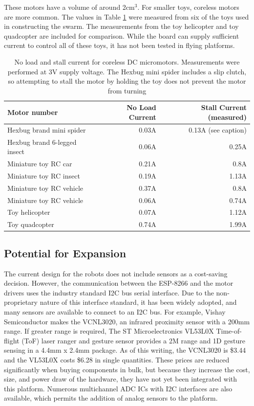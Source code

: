 These motors have a volume of around 2cm$^3$.
For smaller toys, coreless motors are more common. 
The values in Table \ref{tab:coreless} were measured from six of the toys used in constructing the swarm.
The measurements from the toy helicopter and toy quadcopter are included for comparison.
While the board can supply sufficient current to control all of these toys, it has not been tested in flying platforms.

\begin{table}
	\begin{tabular}{l r r}
		Motor number & No Load Current & Stall Current (measured)\\
		\hline 
		Hexbug brand mini spider & 0.03A & 0.13A (see caption) \\
		Hexbug brand 6-legged insect & 0.06A & 0.25A \\
		Miniature toy RC car & 0.21A & 0.8A \\
		Miniature toy RC insect & 0.19A & 1.13A \\
		Miniature toy RC vehicle & 0.37A & 0.8A \\
		Miniature toy RC vehicle & 0.06A & 0.74A \\
		Toy helicopter & 0.07A & 1.12A \\
		Toy quadcopter & 0.74A & 1.99A \\
	\end{tabular}
	\caption{No load and stall current for coreless DC micromotors. Measurements were performed at 3V supply voltage. The Hexbug mini spider includes a slip clutch, so attempting to stall the motor by holding the toy does not prevent the motor from turning}
	\label{tab:coreless}
\end{table}


\subsection{Potential for Expansion} \label{section:Potential_for_Expansion}

The current design for the robots does not include sensors as a cost-saving decision. 
However, the communication between the ESP-8266 and the motor drivers uses the industry standard I2C bus serial interface. 
Due to the non-proprietary nature of this interface standard, it has been widely adopted, and many sensors are available to connect to an I2C bus. 
For example, Vishay Semiconductor makes the VCNL3020, an infrared proximity sensor with a 200mm range. 
If greater range is required, The ST Microelectronics VL53L0X Time-of-flight (ToF) laser ranger and gesture sensor provides a 2M range and 1D gesture sensing in a 4.4mm x 2.4mm package. 
As of this writing, the VCNL3020 is \$3.44 and the VL53L0X costs \$6.28 in single quantities.
These prices are reduced significantly when buying components in bulk, but because they increase the cost, size, and power draw of the hardware, they have not yet been integrated with this platform. 
Numerous multichannel ADC ICs with I2C interfaces are also available, which permits the addition of analog sensors to the platform. 


